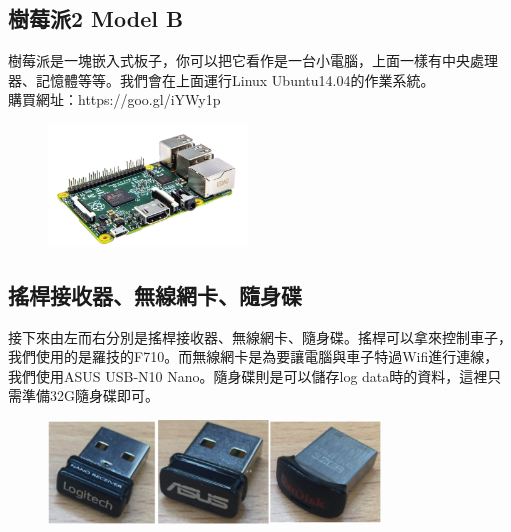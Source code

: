 \documentclass{article}
\begin{document}
\subsection{樹莓派2 Model B}
樹莓派是一塊嵌入式板子，你可以把它看作是一台小電腦，上面一樣有中央處理器、記憶體等等。我們會在上面運行Linux Ubuntu14.04的作業系統。
\\購買網址：https://goo.gl/iYWy1p
\\
\begin{figure}[htp]
    \begin{center}
        \includegraphics[width=150pt]{pic/1_1_2.png}
    \end{center}
\end{figure}

\subsection{搖桿接收器、無線網卡、隨身碟}
接下來由左而右分別是搖桿接收器、無線網卡、隨身碟。搖桿可以拿來控制車子，我們使用的是羅技的F710。而無線網卡是為要讓電腦與車子特過Wifi進行連線，我們使用ASUS USB-N10 Nano。隨身碟則是可以儲存log data時的資料，這裡只需準備32G隨身碟即可。
\\
\begin{figure}[htp]
    \begin{center}
        \includegraphics[width=250pt]{pic/1_1_3.png}
    \end{center}
\end{figure}
\\\\
\end{document}
